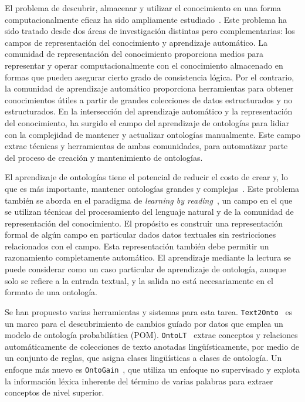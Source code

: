 El problema de descubrir, almacenar y utilizar el conocimiento en una forma computacionalmente eficaz ha sido ampliamente estudiado~\cite{mitchell2015never, ROSPOCHER2016132, cimiano2009ontology}.
Este problema ha sido tratado desde dos áreas de investigación distintas pero complementarias: los campos de representación del conocimiento y aprendizaje automático.
La comunidad de representación del conocimiento proporciona medios para representar y operar computacionalmente con el conocimiento almacenado en formas que pueden asegurar cierto grado de consistencia lógica.
Por el contrario, la comunidad de aprendizaje automático proporciona herramientas para obtener conocimientos útiles a partir de grandes colecciones de datos estructurados y no estructurados.
En la intersección del aprendizaje automático y la representación del conocimiento, ha surgido el campo del aprendizaje de ontologías para lidiar con la complejidad de mantener y actualizar ontologías manualmente.
Este campo extrae técnicas y herramientas de ambas comunidades, para automatizar parte del proceso de creación y mantenimiento de ontologías.

El aprendizaje de ontologías tiene el potencial de reducir el costo de crear y, lo que es más importante, mantener ontologías grandes y complejas~\cite{cimiano2009ontology}.
Este problema también se aborda en el paradigma de \textit{learning by reading}~\cite{barker2007learning}, un campo en el que se utilizan técnicas del procesamiento del lenguaje natural y de la comunidad de representación del conocimiento.
El propósito es construir una representación formal de algún campo en particular dados datos textuales sin restricciones relacionados con el campo.
Esta representación también debe permitir un razonamiento completamente automático. El aprendizaje mediante la lectura se puede considerar como un caso particular de aprendizaje de ontología, aunque solo se refiere a la entrada textual, y la salida no está necesariamente en el formato de una ontología.

Se han propuesto varias herramientas y sistemas para esta tarea.
\texttt{Text2Onto}~\cite{cimiano2005text2onto} es un marco para el descubrimiento de cambios guíado por datos que emplea un modelo de ontología probabilística (POM).
\texttt{OntoLT}~\cite{buitelaar2004ontolt} extrae conceptos y relaciones automáticamente de colecciones de texto anotadas lingüísticamente, por medio de un conjunto de reglas, que asigna clases lingüísticas a clases de ontología.
Un enfoque más nuevo es \texttt{OntoGain}~\cite{drymonas2010unsupervised}, que utiliza un enfoque no supervisado y explota la información léxica inherente del término de varias palabras para extraer conceptos de nivel superior.

